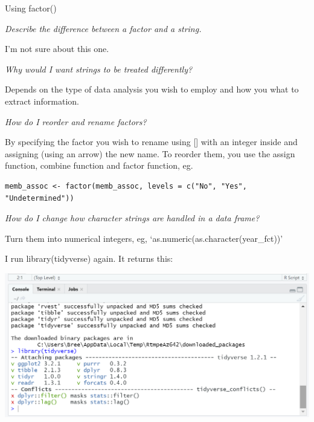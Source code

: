\documentclass{article}
\begin{document}
Using factor()

\textit{Describe the difference between a factor and a string.}

I'm not sure about this one.

\textit{Why would I want strings to be treated differently?}

Depends on the type of data analysis you wish to employ and how you what to extract information.

\textit{How do I reorder and rename factors?}

By specifying the factor you wish to rename using [] with an integer inside and assigning (using an arrow) the new name. To reorder them, you use the assign function, combine function and factor function, eg.
\begin{verbatim}
memb_assoc <- factor(memb_assoc, levels = c("No", "Yes", "Undetermined"))
\end{verbatim}
\textit{How do I change how character strings are handled in a data frame?}

Turn them into numerical integers, eg, `as.numeric(as.character(year\_fct))'


I run library(tidyverse) again. It returns this:

\includegraphics[width=1.0\textwidth]{rstudio_14.PNG}
\end{document}
